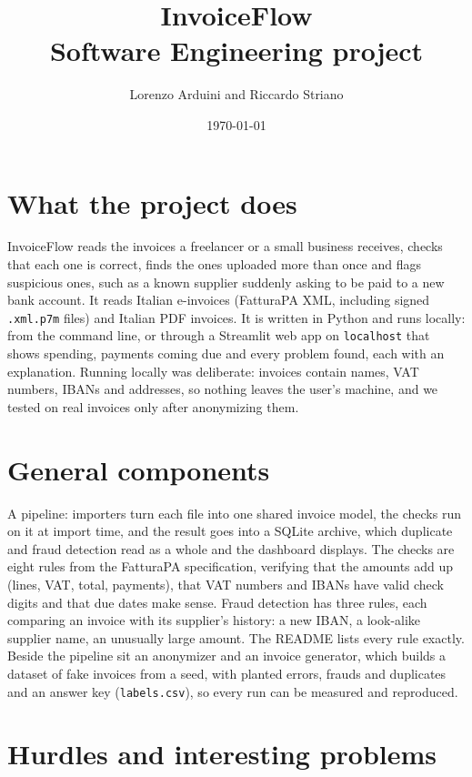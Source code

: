 \documentclass[11pt,a4paper]{article}
\title{InvoiceFlow\\[0.5em] \large Software Engineering project}
\author{Lorenzo Arduini and Riccardo Striano}
\date{\today}
\begin{document}
\maketitle

\section*{What the project does}

InvoiceFlow reads the invoices a freelancer or a small business receives, checks that each one
is correct, finds the ones uploaded more than once and flags suspicious ones, such as a known
supplier suddenly asking to be paid to a new bank account. It reads Italian e-invoices
(FatturaPA XML, including signed \texttt{.xml.p7m} files) and Italian PDF invoices. It is
written in Python and runs locally: from the command line, or through a Streamlit web app on
\texttt{localhost} that shows spending, payments coming due and every problem found, each with
an explanation. Running locally was deliberate: invoices contain names, VAT numbers, IBANs and
addresses, so nothing leaves the user's machine, and we tested on real invoices only after
anonymizing them.

\section*{General components}

A pipeline: importers turn each file into one shared invoice model, the checks run on it at
import time, and the result goes into a SQLite archive, which duplicate and fraud detection read
as a whole and the dashboard displays. The checks are eight rules from the FatturaPA specification,
verifying that the amounts add up (lines, VAT, total, payments), that VAT numbers and IBANs have
valid check digits and that due dates make sense. Fraud detection has three rules, each comparing
an invoice with its supplier's history: a new IBAN, a look-alike supplier name, an unusually
large amount. The README lists every rule exactly. Beside the pipeline sit an anonymizer and an invoice generator, which builds a dataset
of fake invoices from a seed, with planted errors, frauds and duplicates and an answer key
(\texttt{labels.csv}), so every run can be measured and reproduced.

\section*{Hurdles and interesting problems}
\end{document}
